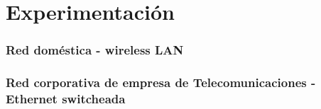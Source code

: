 \section{Experimentación}


\newpage

\subsubsection{Red doméstica - wireless LAN}

\newpage

\subsubsection{Red corporativa de empresa de Telecomunicaciones - Ethernet switcheada}

\newpage


\newpage